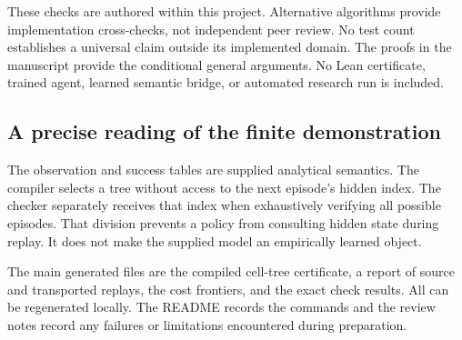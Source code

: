 \documentclass[11pt,letterpaper]{article}
\theoremstyle{plain}
\theoremstyle{definition}
\begin{document}
These checks are authored within this project. Alternative algorithms provide implementation cross-checks, not independent peer review. No test count establishes a universal claim outside its implemented domain. The proofs in the manuscript provide the conditional general arguments. No Lean certificate, trained agent, learned semantic bridge, or automated research run is included.

\subsection{A precise reading of the finite demonstration}
The observation and success tables are supplied analytical semantics. The compiler selects a tree without access to the next episode's hidden index. The checker separately receives that index when exhaustively verifying all possible episodes. That division prevents a policy from consulting hidden state during replay. It does not make the supplied model an empirically learned object.

The main generated files are the compiled cell-tree certificate, a report of source and transported replays, the cost frontiers, and the exact check results. All can be regenerated locally. The README records the commands and the review notes record any failures or limitations encountered during preparation.
\end{document}
